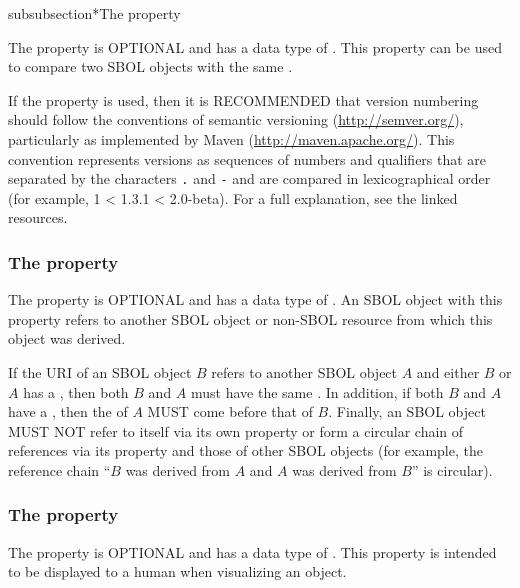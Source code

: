 subsubsection*{The  property}
\label{sec:version}

The  property is OPTIONAL and has a data type of . This property can be used to compare two SBOL objects with the same .

If the  property is used, then it is RECOMMENDED that version numbering should follow the conventions of semantic versioning (\url{http://semver.org/}), particularly as implemented by Maven (\url{http://maven.apache.org/}).
This convention represents versions as sequences of numbers and qualifiers that are separated by the characters {\tt .} and {\tt -} and are compared in lexicographical order (for example, 1 < 1.3.1 < 2.0-beta).
For a full explanation, see the linked resources.

\subsubsection*{The  property}
\label{sec:wasDerivedFrom}

The  property is OPTIONAL and has a data type of . An SBOL object with this property refers to another SBOL object or non-SBOL resource from which this object was derived. 

If the  URI of an SBOL object $B$ refers to another SBOL object $A$ and either $B$ or $A$ has a , then both $B$ and $A$ must have the same  . In addition, if both $B$ and $A$ have a , then the   of $A$ MUST come before that of $B$. Finally, an SBOL object MUST NOT refer to itself via its own   property or form a circular chain of references via its  property and those of other SBOL objects (for example, the reference chain ``$B$ was derived from $A$ and $A$ was derived from $B$'' is circular).

\subsubsection*{The  property}
\label{sec:name}


The  property is OPTIONAL and has a data type of . This property is intended to be displayed to a human when visualizing an  object.

